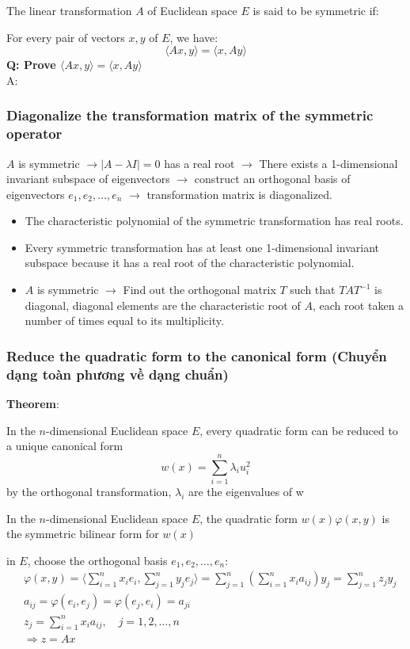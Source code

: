 The linear transformation $A$ of Euclidean space $E$ is said to be symmetric if:

For every pair of vectors $x, y$ of $E$, we have:
\begin{equation*}
    \langle Ax, y \rangle = \langle x, Ay \rangle
\end{equation*}
\textbf{Q: Prove $\langle Ax, y \rangle = \langle x, Ay \rangle$}\\
A:


\subsubsection{Diagonalize the transformation matrix of the symmetric operator}

$A$ is symmetric $\rightarrow |A - \lambda I| = 0$ has a real root $\rightarrow$ There exists a 1-dimensional invariant subspace of eigenvectors $\rightarrow$ construct an orthogonal basis of eigenvectors $e_1, e_2, \dots, e_n$ $\rightarrow$ transformation matrix is diagonalized.
\begin{itemize}
    \item The characteristic polynomial of the symmetric transformation has real roots.
    \item Every symmetric transformation has at least one 1-dimensional invariant subspace because it has a real root of the characteristic polynomial.
    \item $A$ is symmetric $\rightarrow$ Find out the orthogonal matrix $T$ such that $TAT^{-1}$ is diagonal, diagonal elements are the characteristic root of $A$, each root taken a number of times equal to its multiplicity.
\end{itemize}

\subsubsection{Reduce the quadratic form to the canonical form (Chuyển dạng toàn phương về dạng chuẩn)}
\textbf{Theorem}:

In the $n$-dimensional Euclidean space $E$, every quadratic form can be reduced to a unique canonical form 
\[
w(x) = \sum_{i=1}^n \lambda_i u_i^2
\]
by the orthogonal transformation, $\lambda_i$ are the eigenvalues of w

In the $n$-dimensional Euclidean space $E$, the quadratic form $w(x)\varphi(x,y)$ is the symmetric bilinear form for $w(x)$

in $E$, choose the orthogonal basis $e_1, e_2, \ldots, e_n$:
\begin{align*}
    &\varphi(x, y) = \langle\sum_{i=1}^nx_ie_i, \sum_{j=1}^n  y_j e_j\rangle = \sum_{j=1}^n \left(\sum_{i=1}^n x_ia_{ij}\right)y_j = \sum_{j=1}^n z_j y_j\\
    &a_{ij} = \varphi(e_i, e_j) = \varphi(e_j, e_i) = a_{ji}\\
    &z_j = \sum_{i=1}^n x_i a_{ij}, \quad j = 1, 2, \ldots, n\\
    &\Rightarrow z = Ax
\end{align*}

